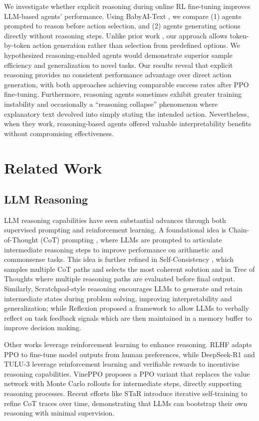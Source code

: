 \documentclass[11pt,a4paper]{article}
\begin{document}
We investigate whether explicit reasoning during online RL fine-tuning improves LLM-based agents' performance. Using BabyAI-Text \cite{carta2023grounding}, we compare (1) agents prompted to reason before action selection, and (2) agents generating actions directly without reasoning steps. Unlike prior work \cite{carta2023grounding}, our approach allows token-by-token action generation rather than selection from predefined options. We hypothesized reasoning-enabled agents would demonstrate superior sample efficiency and generalization to novel tasks.
Our results reveal that explicit reasoning provides no consistent performance advantage over direct action generation, with both approaches achieving comparable success rates after PPO fine-tuning. Furthermore, reasoning agents sometimes exhibit greater training instability and occasionally a ``reasoning collapse'' phenomenon where explanatory text devolved into simply stating the intended action. Nevertheless, when they work, reasoning-based agents offered valuable interpretability benefits without compromising effectiveness.

\section{Related Work}
\subsection{LLM Reasoning}
LLM reasoning capabilities have seen substantial advances through both supervised prompting and reinforcement learning. A foundational idea is Chain-of-Thought (CoT) prompting \cite{wei2022chain}, where LLMs are prompted to articulate intermediate reasoning steps to improve performance on arithmetic and commonsense tasks. This idea is further refined in Self-Consistency \cite{wang2022self}, which samples multiple CoT paths and selects the most coherent solution and in Tree of Thoughts \cite{yao2023treethoughtsdeliberateproblem} where multiple reasoning paths are evaluated before final output. Similarly, Scratchpad-style reasoning \cite{nye2021show} encourages LLMs to generate and retain intermediate states during problem solving, improving interpretability and generalization; while Reflexion \cite{shinn2023reflexion} proposed a framework to allow LLMs to verbally reflect on task feedback signals which are then maintained in a memory buffer to improve decision making.

Other works leverage reinforcement learning to enhance reasoning. RLHF \cite{ouyang2022training} adapts PPO to fine-tune model outputs from human preferences, while DeepSeek-R1 \cite{deepseek2025r1} and TULU-3 \cite{lambert2024t} leverage reinforcement learning and verifiable rewards to incentivise reasoning capabilities. VinePPO \cite{kazemnejad2024vineppo} proposes a PPO variant that replaces the value network with Monte Carlo rollouts for intermediate steps, directly supporting reasoning processes. Recent efforts like STaR \cite{zelikman2022star} introduce iterative self-training to refine CoT traces over time, demonstrating that LLMs can bootstrap their own reasoning with minimal supervision.
\end{document}
